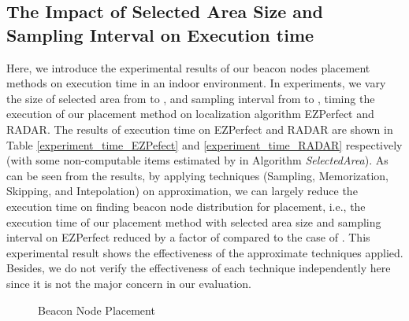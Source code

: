 \documentclass[10pt, conference, letterpaper]{IEEEtran}
\begin{document}
\subsection{The Impact of Selected Area Size and Sampling Interval on Execution time}
Here, we introduce the experimental results of our beacon nodes placement methods on execution time in an indoor environment. In experiments, we vary the size of selected area from  to , and sampling interval from  to , timing the execution of our placement method on localization algorithm EZPerfect and RADAR. The results of execution time on EZPerfect and RADAR are shown in Table \ref{experiment_time_EZPefect} and \ref{experiment_time_RADAR} respectively (with some non-computable items estimated by  in Algorithm \textit{SelectedArea}). As can be seen from the results, by applying techniques (Sampling, Memorization, Skipping, and Intepolation) on approximation, we can largely reduce the execution time on finding beacon node distribution for placement, i.e., the execution time of our placement method with selected area size  and sampling interval   on EZPerfect reduced by a factor of  compared to the case of . This experimental result shows the effectiveness of the approximate techniques applied. Besides, we do not verify the effectiveness of each technique independently here since it is not the major concern in our evaluation.

\begin{figure}[!t] \centering
{}
\caption{Beacon Node Placement}
\label{fig2}
\end{figure}
\end{document}
